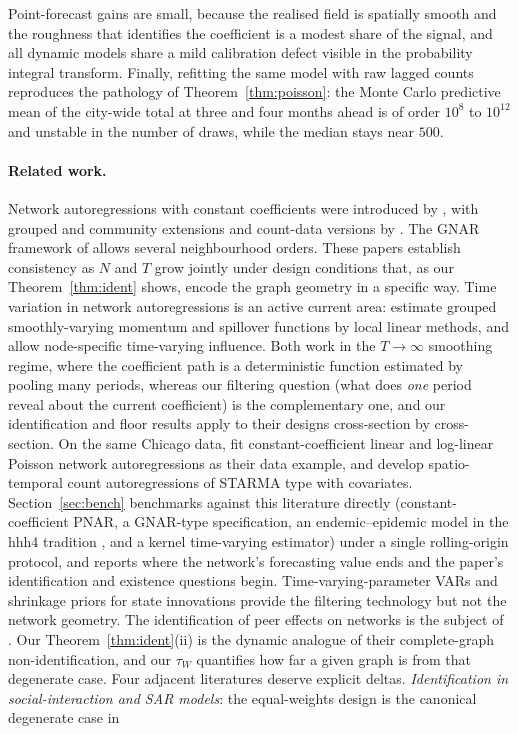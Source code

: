 \documentclass[12pt]{article}
\theoremstyle{plain}
\theoremstyle{definition}
\theoremstyle{remark}
\newcommand{\tauW}{\tau_W}
\begin{document}
Point-forecast gains are small, because the realised field is spatially smooth and the roughness that identifies the coefficient is a modest share of the signal, and all dynamic models share a mild calibration defect visible in the probability integral transform. Finally, refitting the same model with raw lagged counts reproduces the pathology of Theorem~\ref{thm:poisson}: the Monte Carlo predictive mean of the city-wide total at three and four months ahead is of order $10^{8}$ to $10^{12}$ and unstable in the number of draws, while the median stays near $500$.

\paragraph{Related work.} Network autoregressions with constant coefficients were introduced by \citet{zhu2017network}, with grouped and community extensions \citep{zhu2020grouped,chen2023community} and count-data versions by \citet{armillotta2023nonlinear,armillotta2024count}. The GNAR framework of \citet{knight2020gnar} allows several neighbourhood orders. These papers establish consistency as $N$ and $T$ grow jointly under design conditions that, as our Theorem~\ref{thm:ident} shows, encode the graph geometry in a specific way. Time variation in network autoregressions is an active current area: \citet{li2026grouped} estimate grouped smoothly-varying momentum and spillover functions by local linear methods, and \citet{ding2025tvnar} allow node-specific time-varying influence. Both work in the $T\to\infty$ smoothing regime, where the coefficient path is a deterministic function estimated by pooling many periods, whereas our filtering question (what does \emph{one} period reveal about the current coefficient) is the complementary one, and our identification and floor results apply to their designs cross-section by cross-section. On the same Chicago data, \citet{armillotta2024count} fit constant-coefficient linear and log-linear Poisson network autoregressions as their data example, and \citet{maletz2024spatiotemporal} develop spatio-temporal count autoregressions of STARMA type with covariates. Section~\ref{sec:bench} benchmarks against this literature directly (constant-coefficient PNAR, a GNAR-type specification, an endemic--epidemic model in the hhh4 tradition \citep{held2005statistical}, and a kernel time-varying estimator) under a single rolling-origin protocol, and reports where the network's forecasting value ends and the paper's identification and existence questions begin. Time-varying-parameter VARs \citep{primiceri2005time,koop2013large} and shrinkage priors for state innovations \citep{fruhwirth2010stochastic,bitto2019achieving} provide the filtering technology but not the network geometry. The identification of peer effects on networks is the subject of \citet{manski1993identification,lee2007identification,bramoulle2009identification}. Our Theorem~\ref{thm:ident}(ii) is the dynamic analogue of their complete-graph non-identification, and our $\tauW$ quantifies how far a given graph is from that degenerate case. Four adjacent literatures deserve explicit deltas. \emph{Identification in social-interaction and SAR models}: the equal-weights design is the canonical degenerate case in 
\end{document}
